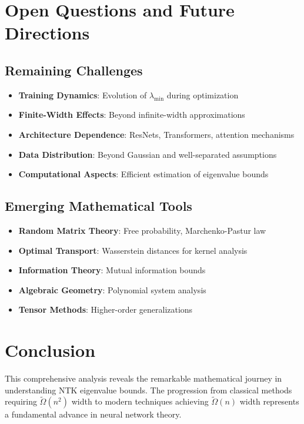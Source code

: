 \documentclass{article}
\newcommand{\lambdaMin}{\lambda_{\min}}
\newcommand{\TildeOmega}{\tilde{\Omega}}
\begin{document}
\section{Open Questions and Future Directions}

\subsection{Remaining Challenges}

\begin{itemize}
    \item \textbf{Training Dynamics}: Evolution of $\lambdaMin$ during optimization
    \item \textbf{Finite-Width Effects}: Beyond infinite-width approximations
    \item \textbf{Architecture Dependence}: ResNets, Transformers, attention mechanisms
    \item \textbf{Data Distribution}: Beyond Gaussian and well-separated assumptions
    \item \textbf{Computational Aspects}: Efficient estimation of eigenvalue bounds
\end{itemize}

\subsection{Emerging Mathematical Tools}

\begin{itemize}
    \item \textbf{Random Matrix Theory}: Free probability, Marchenko-Pastur law
    \item \textbf{Optimal Transport}: Wasserstein distances for kernel analysis
    \item \textbf{Information Theory}: Mutual information bounds
    \item \textbf{Algebraic Geometry}: Polynomial system analysis
    \item \textbf{Tensor Methods}: Higher-order generalizations
\end{itemize}

\section{Conclusion}

This comprehensive analysis reveals the remarkable mathematical journey in understanding NTK eigenvalue bounds. The progression from classical methods requiring $\TildeOmega(n^2)$ width to modern techniques achieving $\TildeOmega(n)$ width represents a fundamental advance in neural network theory.
\end{document}
